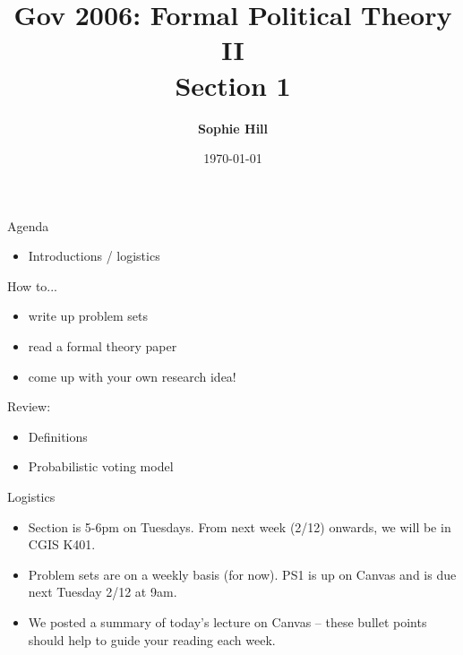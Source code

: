 \documentclass[aspectratio=169]{beamer}
\title{Gov 2006: Formal Political Theory II \\
Section 1}
\date{\today}
\author{ \textbf{Sophie Hill}}
\begin{document}
  \maketitle
  

\begin{frame}{Agenda}



\begin{itemize}
\setlength \itemsep{0.5em}
\item Introductions / logistics
\end{itemize}

\pause 

How to... 
\begin{itemize}

\item write up problem sets
\item read a formal theory paper
\item come up with your own research idea!
\end{itemize}

\pause 

Review:
\begin{itemize}
\item Definitions
\item Probabilistic voting model
\end{itemize}

\end{frame}
\begin{frame}{Logistics}

\Large

\begin{itemize}
\setlength \itemsep{0.8em}

\item Section is 5-6pm on Tuesdays. From next week (2/12) onwards, we will be in \alert{CGIS K401}. 
\pause
 
\item Problem sets are on a weekly basis (for now). PS1 is up on Canvas and is \alert{due next Tuesday 2/12 at 9am}.
\pause

\item We posted a summary of today's lecture on Canvas -- these bullet points should help to guide your reading each week.
\end{itemize}


\end{frame}
\end{document}
